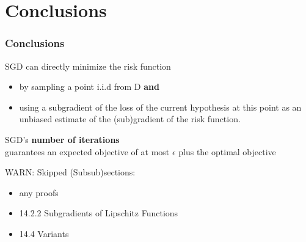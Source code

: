 \section{Conclusions}

\begin{frame}
\frametitle{Conclusions}

SGD can directly minimize the risk function
\begin{itemize}
    \item by sampling a point i.i.d from D \textbf{and}
    \item using a subgradient of the loss of the current hypothesis at this point as
    an unbiased estimate of the (sub)gradient of the risk function.
\end{itemize}
\vspace{5mm}

SGD's \textbf{number of iterations} \\
guarantees an expected objective of at most $\epsilon$ plus the optimal objective
\vspace{5mm}

WARN: Skipped (Subsub)sections:\\
\begin{itemize}
    \item any proofs
    \item 14.2.2 Subgradients of Lipschitz Functions
    \item 14.4 Variants
\end{itemize}

\end{frame}

